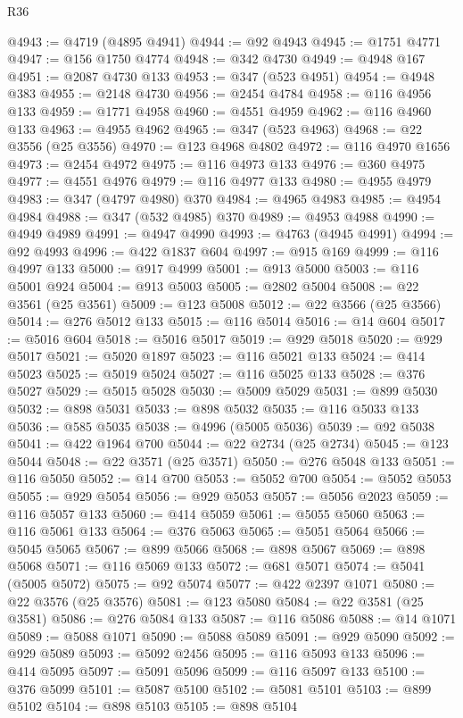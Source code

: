 \begin{lexlean}{R36}
\begin{coremodule}
@4943 := @4719 (@4895 @4941)
@4944 := @92 @4943
@4945 := @1751 @4771
@4947 := @156 @1750 @4774
@4948 := @342 @4730
@4949 := @4948 @167
@4951 := @2087 @4730 @133
@4953 := @347 (@523 @4951)
@4954 := @4948 @383
@4955 := @2148 @4730
@4956 := @2454 @4784
@4958 := @116 @4956 @133
@4959 := @1771 @4958
@4960 := @4551 @4959
@4962 := @116 @4960 @133
@4963 := @4955 @4962
@4965 := @347 (@523 @4963)
@4968 := @22 @3556 (@25 @3556)
@4970 := @123 @4968 @4802
@4972 := @116 @4970 @1656
@4973 := @2454 @4972
@4975 := @116 @4973 @133
@4976 := @360 @4975
@4977 := @4551 @4976
@4979 := @116 @4977 @133
@4980 := @4955 @4979
@4983 := @347 (@4797 @4980) @370
@4984 := @4965 @4983
@4985 := @4954 @4984
@4988 := @347 (@532 @4985) @370
@4989 := @4953 @4988
@4990 := @4949 @4989
@4991 := @4947 @4990
@4993 := @4763 (@4945 @4991)
@4994 := @92 @4993
@4996 := @422 @1837 @604
@4997 := @915 @169
@4999 := @116 @4997 @133
@5000 := @917 @4999
@5001 := @913 @5000
@5003 := @116 @5001 @924
@5004 := @913 @5003
@5005 := @2802 @5004
@5008 := @22 @3561 (@25 @3561)
@5009 := @123 @5008
@5012 := @22 @3566 (@25 @3566)
@5014 := @276 @5012 @133
@5015 := @116 @5014
@5016 := @14 @604
@5017 := @5016 @604
@5018 := @5016 @5017
@5019 := @929 @5018
@5020 := @929 @5017
@5021 := @5020 @1897
@5023 := @116 @5021 @133
@5024 := @414 @5023
@5025 := @5019 @5024
@5027 := @116 @5025 @133
@5028 := @376 @5027
@5029 := @5015 @5028
@5030 := @5009 @5029
@5031 := @899 @5030
@5032 := @898 @5031
@5033 := @898 @5032
@5035 := @116 @5033 @133
@5036 := @585 @5035
@5038 := @4996 (@5005 @5036)
@5039 := @92 @5038
@5041 := @422 @1964 @700
@5044 := @22 @2734 (@25 @2734)
@5045 := @123 @5044
@5048 := @22 @3571 (@25 @3571)
@5050 := @276 @5048 @133
@5051 := @116 @5050
@5052 := @14 @700
@5053 := @5052 @700
@5054 := @5052 @5053
@5055 := @929 @5054
@5056 := @929 @5053
@5057 := @5056 @2023
@5059 := @116 @5057 @133
@5060 := @414 @5059
@5061 := @5055 @5060
@5063 := @116 @5061 @133
@5064 := @376 @5063
@5065 := @5051 @5064
@5066 := @5045 @5065
@5067 := @899 @5066
@5068 := @898 @5067
@5069 := @898 @5068
@5071 := @116 @5069 @133
@5072 := @681 @5071
@5074 := @5041 (@5005 @5072)
@5075 := @92 @5074
@5077 := @422 @2397 @1071
@5080 := @22 @3576 (@25 @3576)
@5081 := @123 @5080
@5084 := @22 @3581 (@25 @3581)
@5086 := @276 @5084 @133
@5087 := @116 @5086
@5088 := @14 @1071
@5089 := @5088 @1071
@5090 := @5088 @5089
@5091 := @929 @5090
@5092 := @929 @5089
@5093 := @5092 @2456
@5095 := @116 @5093 @133
@5096 := @414 @5095
@5097 := @5091 @5096
@5099 := @116 @5097 @133
@5100 := @376 @5099
@5101 := @5087 @5100
@5102 := @5081 @5101
@5103 := @899 @5102
@5104 := @898 @5103
@5105 := @898 @5104

\end{coremodule}
\end{lexlean}
